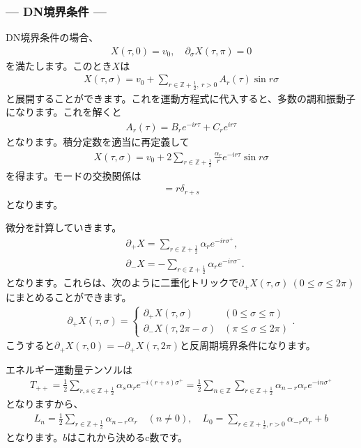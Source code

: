 \documentclass[report,paper=a4, fontsize=12pt, line_length=16cm, number_of_lines=34,dvipdfmx]{jlreq}
\numberwithin{equation}{chapter}
\numberwithin{equation}{section}
\newcommand{\Zb}{\mathbb{Z}}
\newcommand{\del}{\partial}
\newcommand{\Zbh}{\Zb+\frac12}
\begin{document}
\subsubsection*{--- DN境界条件 ---}
DN境界条件の場合、
\begin{align}
  X(\tau,0)=v_0,\quad \del_{\sigma}X(\tau,\pi)=0
\end{align}
を満たします。このとき$X$は
\begin{align}
  X(\tau,\sigma)=v_0+\sum_{r\in \Zbh,\ r>0}A_{r}(\tau)\sin r\sigma
\end{align}
と展開することができます。これを運動方程式に代入すると、多数の調和振動子になります。これを解くと
\begin{align}
  A_{r}(\tau)=B_{r}e^{-ir\tau}+C_{r}e^{ir\tau}
\end{align}
となります。積分定数を適当に再定義して
\begin{align}
  X(\tau,\sigma)=v_{0}+2\sum_{r\in \Zbh}\frac{\alpha_{r}}{r}e^{-ir\tau}\sin r\sigma
\end{align}
を得ます。モードの交換関係は
\begin{align}
  [\alpha_{r},\alpha_{s}]=r\delta_{r+s}
\end{align}
となります。

微分を計算していきます。
\begin{align}
  &\del_{+}X=\sum_{r\in \Zbh}\alpha_{r}e^{-ir\sigma^{+}},\\
  &\del_{-}X=-\sum_{r\in \Zbh}\alpha_{r}e^{-ir\sigma^{-}}.
\end{align}
となります。これらは、次のように二重化トリックで$\del_{+}X(\tau,\sigma)\ (0\le \sigma \le 2\pi)$にまとめることができます。
\begin{align}
  \del_{+}X(\tau,\sigma)=
  \begin{cases}
    \del_{+}X(\tau,\sigma)& (0\le \sigma \le \pi)\\
    \del_{-}X(\tau,2\pi-\sigma) & (\pi\le \sigma \le 2\pi)
  \end{cases}.
\end{align}
こうすると$\del_{+}X(\tau,0)=-\del_{+}X(\tau,2\pi)$と反周期境界条件になります。

エネルギー運動量テンソルは
\begin{align}
  T_{++}
  =\frac12 \sum_{r,s\in \Zbh}\alpha_{s}\alpha_{r} e^{-i(r+s)\sigma^{+}}
  =\frac12 \sum_{n\in\Zb}\sum_{r\in \Zbh}\alpha_{n-r}\alpha_{r} e^{-in\sigma^{+}}
\end{align}
となりますから、
\begin{align}
  L_{n}=\frac12 \sum_{r\in \Zbh}
  \alpha_{n-r}\alpha_{r}\quad (n\ne 0),\quad
  L_{0}=\sum_{r\in \Zbh,r>0}\alpha_{-r}\alpha_{r}+b
\end{align}
となります。$b$はこれから決めるc数です。
\end{document}
